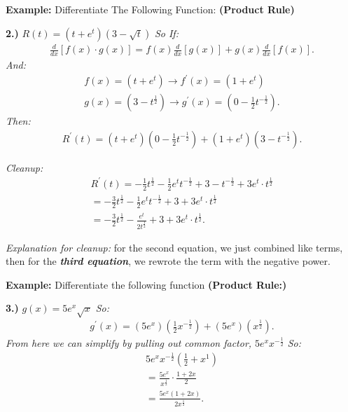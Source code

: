 \documentclass{report}
\begin{document}
  \pagebreak \bigbreak \noindent
  \begin{mdframed}
    \textbf{Example:} Differentiate The Following Function: \textbf{(Product Rule)}
  \end{mdframed}
  \bigbreak \noindent 
  \textbf{2.)} $R(t) = (t+e^t)(3- \sqrt{t})$
  \bigbreak \noindent 
  \textit{So If:}
  \begin{align*}
    \frac{d}{dx}[f(x) \cdot g(x)] = f(x) \frac{d}{dx}[g(x)] + g(x) \frac{d}{dx}[f(x)]
  .\end{align*}
  \bigbreak \noindent 
  \textit{And:}
  \begin{align*}
    f(x) = (t+e^t) \longrightarrow f ^{\prime}(x) = (1+e^t) \\ 
    g(x) = (3-t^{ \frac{1}{2}}) \longrightarrow g ^{\prime}(x) = (0 - \frac{1}{2}t^{- \frac{1}{2}})
  .\end{align*}
  \bigbreak \noindent 
  \textit{Then:}
  \begin{align*}
    R ^{\prime}(t) = (t+e^t)(0- \frac{1}{2}t^{-\frac{1}{2}}) + (1+e^t)(3-t^{-\frac{1}{2}})
  .\end{align*}

  \bigbreak \noindent 
  \textit{Cleanup:}
  \begin{align*}
    R ^{\prime}(t) =- \frac{1}{2}t^{ \frac{1}{2}} - \frac{1}{2} e^t t^{- \frac{1}{2}} + 3 - t^{- \frac{1}{2}} + 3e^t \cdot t^{ \frac{1}{2}} \\ 
    = -\frac{3}{2}t^{ \frac{1}{2}} - \frac{1}{2} e^t t^{- \frac{1}{2}} + 3 + 3e^t \cdot t^{ \frac{1}{2}} \\  
    = -\frac{3}{2}t^{ \frac{1}{2}} - \frac{e^t}{2t^{ \frac{1}{2}}}+ 3 + 3e^t \cdot t^{ \frac{1}{2}}  
  .\end{align*}

  \bigbreak \noindent 
  \textit{Explanation for cleanup:}
  \bigbreak \noindent 
  for the second equation, we just combined like terms, then for the \textbf{\textit{third equation}}, we rewrote the term with the negative power.

  \bigbreak \noindent 
  \begin{mdframed}
    \textbf{Example:} Differentiate the following function \textbf{(Product Rule:)}
  \end{mdframed}
  \bigbreak \noindent 
  \textbf{3.)} $g(x) = 5e^x \sqrt{x}$
  \bigbreak \noindent 
  \textit{So:}
  \begin{align*}
    g ^{\prime}(x) = (5e^x)( \frac{1}{2}x^{- \frac{1}{2}}) + (5e^x)(x^{ \frac{1}{2}})
  .\end{align*}
  \bigbreak \noindent 
  \textit{From here we can simplify by pulling out common factor, $5e^x x^{- \frac{1}{2}}$}
  \bigbreak \noindent 
  \textit{So:}
  \begin{align*}
    5e^xx^{- \frac{1}{2}}( \frac{1}{2} + x^1) \\ 
    = \frac{5e^x}{x^{ \frac{1}{2}}} \cdot \frac{1+2x}{2} \\
    = \frac{5e^x(1+2x)}{2x^{ \frac{1}{2}}}
  .\end{align*}
\end{document}
